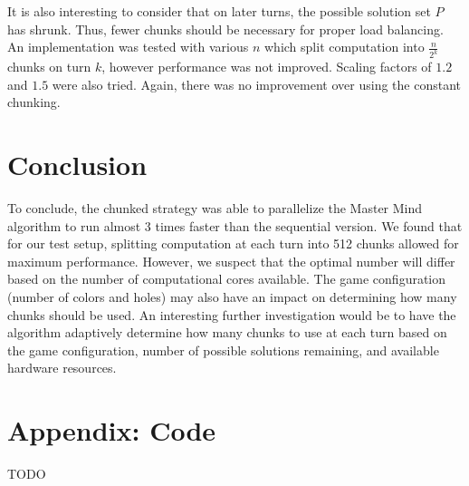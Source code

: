 \documentclass{article}
\begin{document}
It is also interesting to consider that on later turns, the possible solution set $P$ has shrunk. Thus, fewer chunks should be necessary for proper load balancing. An implementation was tested with various $n$ which split computation into $\frac{n}{2^k}$ chunks on turn $k$, however performance was not improved. Scaling factors of $1.2$ and $1.5$ were also tried. Again, there was no improvement over using the constant chunking.


\section{Conclusion}
To conclude, the chunked strategy was able to parallelize the Master Mind algorithm to run almost 3 times faster than the sequential version. We found that for our test setup, splitting computation at each turn into 512 chunks allowed for maximum performance. However, we suspect that the optimal number will differ based on the number of computational cores available. The game configuration (number of colors and holes) may also have an impact on determining how many chunks should be used. An interesting further investigation would be to have the algorithm adaptively determine how many chunks to use at each turn based on the game configuration, number of possible solutions remaining, and available hardware resources.

\section{Appendix: Code}
\label{sec:code}
TODO
\end{document}
